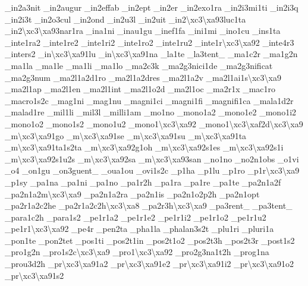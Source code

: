 {\-\_\-in2a3nit \-\_\-in2augur \-\_\-in2effab \-\_\-in2ept \-\_\-in2er \-\_\-in2exo1ra \-\_\-in2i3mi1ti \-\_\-in2i3q \-\_\-in2i3t \-\_\-in2o3cul \-\_\-in2ond \-\_\-in2u3l \-\_\-in2uit \-\_\-in2\textbackslash{}xc3\textbackslash{}xa93luc1ta \-\_\-in2\textbackslash{}xc3\textbackslash{}xa93nar1ra \-\_\-ina1ni \-\_\-inau1gu \-\_\-inef1fa \-\_\-ini1mi \-\_\-ino1cu \-\_\-ins1ta \-\_\-inte1ra2 \-\_\-inte1re2 \-\_\-inte1ri2 \-\_\-inte1ro2 \-\_\-inte1ru2 \-\_\-inte1r\textbackslash{}xc3\textbackslash{}xa92 \-\_\-inte4r3 \-\_\-inters2 \-\_\-in\textbackslash{}xc3\textbackslash{}xa91lu \-\_\-in\textbackslash{}xc3\textbackslash{}xa91na \-\_\-la1te \-\_\-la3tent\-\_\- \-\_\-ma1c2r \-\_\-ma1g2n \-\_\-ma1la \-\_\-ma1le \-\_\-ma1li \-\_\-ma1lo \-\_\-ma2c3k \-\_\-ma2g3nici1de \-\_\-ma2g3nificat \-\_\-ma2g3num \-\_\-ma2l1a2d1ro \-\_\-ma2l1a2dres \-\_\-ma2l1a2v \-\_\-ma2l1ai1s\textbackslash{}xc3\textbackslash{}xa9 \-\_\-ma2l1ap \-\_\-ma2l1en \-\_\-ma2l1int \-\_\-ma2l1o2d \-\_\-ma2l1oc \-\_\-ma2r1x \-\_\-mac1ro \-\_\-macro1s2c \-\_\-mag1ni \-\_\-mag1nu \-\_\-magni1ci \-\_\-magni1fi \-\_\-magnifi1ca \-\_\-mala1d2r \-\_\-malad1re \-\_\-mil1li \-\_\-mil3l \-\_\-milli1am \-\_\-mo1no \-\_\-mono1a2 \-\_\-mono1e2 \-\_\-mono1i2 \-\_\-mono1o2 \-\_\-mono1s2 \-\_\-mono1u2 \-\_\-mono1\textbackslash{}xc3\textbackslash{}xa92 \-\_\-mono1\textbackslash{}xc3\textbackslash{}xaf2d\textbackslash{}xc3\textbackslash{}xa9 \-\_\-m\textbackslash{}xc3\textbackslash{}xa91go \-\_\-m\textbackslash{}xc3\textbackslash{}xa91se \-\_\-m\textbackslash{}xc3\textbackslash{}xa91su \-\_\-m\textbackslash{}xc3\textbackslash{}xa91ta \-\_\-m\textbackslash{}xc3\textbackslash{}xa91ta1s2ta \-\_\-m\textbackslash{}xc3\textbackslash{}xa92g1oh \-\_\-m\textbackslash{}xc3\textbackslash{}xa92s1es \-\_\-m\textbackslash{}xc3\textbackslash{}xa92s1i \-\_\-m\textbackslash{}xc3\textbackslash{}xa92s1u2s \-\_\-m\textbackslash{}xc3\textbackslash{}xa92sa \-\_\-m\textbackslash{}xc3\textbackslash{}xa93san \-\_\-no1no \-\_\-no2n1obs \-\_\-o1vi \-\_\-o4 \-\_\-on1gu \-\_\-on3guent\-\_\- \-\_\-oua1ou \-\_\-ovi1s2c \-\_\-p1ha \-\_\-p1lu \-\_\-p1ro \-\_\-p1r\textbackslash{}xc3\textbackslash{}xa9 \-\_\-p1sy \-\_\-pa1na \-\_\-pa1ni \-\_\-pa1no \-\_\-pa1r2h \-\_\-pa1ra \-\_\-pa1re \-\_\-pa1te \-\_\-pa2n1a2f \-\_\-pa2n1a2m\textbackslash{}xc3\textbackslash{}xa9 \-\_\-pa2n1a2ra \-\_\-pa2n1is \-\_\-pa2n1o2p2h \-\_\-pa2n1opt \-\_\-pa2r1a2c2he \-\_\-pa2r1a2c2h\textbackslash{}xc3\textbackslash{}xa8 \-\_\-pa2r3h\textbackslash{}xc3\textbackslash{}xa9 \-\_\-pa3rent\-\_\- \-\_\-pa3tent\-\_\- \-\_\-para1c2h \-\_\-para1s2 \-\_\-pe1r1a2 \-\_\-pe1r1e2 \-\_\-pe1r1i2 \-\_\-pe1r1o2 \-\_\-pe1r1u2 \-\_\-pe1r1\textbackslash{}xc3\textbackslash{}xa92 \-\_\-pe4r \-\_\-pen2ta \-\_\-pha1la \-\_\-phalan3s2t \-\_\-plu1ri \-\_\-pluri1a \-\_\-pon1te \-\_\-pon2tet \-\_\-pos1ti \-\_\-pos2t1in \-\_\-pos2t1o2 \-\_\-pos2t3h \-\_\-pos2t3r \-\_\-post1s2 \-\_\-pro1g2n \-\_\-pro1s2c\textbackslash{}xc3\textbackslash{}xa9 \-\_\-pro1\textbackslash{}xc3\textbackslash{}xa92 \-\_\-pro2g3na1t2h \-\_\-prog1na \-\_\-prou3d2h \-\_\-pr\textbackslash{}xc3\textbackslash{}xa91a2 \-\_\-pr\textbackslash{}xc3\textbackslash{}xa91e2 \-\_\-pr\textbackslash{}xc3\textbackslash{}xa91i2 \-\_\-pr\textbackslash{}xc3\textbackslash{}xa91o2 \-\_\-pr\textbackslash{}xc3\textbackslash{}xa91s2 }
